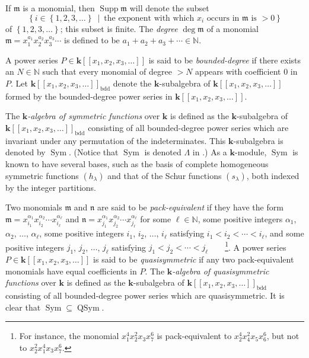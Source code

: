 \documentclass[numbers=enddot,12pt,final,onecolumn,notitlepage,abstracton]{scrartcl}%
\theoremstyle{definition}
\begin{document}
If $\mathfrak{m}$ is a monomial, then $\operatorname*{Supp}\mathfrak{m}$ will
denote the subset
\[
\left\{  i\in\left\{  1,2,3,\ldots\right\}  \ \mid\ \text{the exponent with
which }x_{i}\text{ occurs in }\mathfrak{m}\text{ is }>0\right\}
\]
of $\left\{  1,2,3,\ldots\right\}  $; this subset is finite. The
\textit{degree} $\deg\mathfrak{m}$ of a monomial $\mathfrak{m}=x_{1}^{a_{1}%
}x_{2}^{a_{2}}x_{3}^{a_{3}}\cdots$ is defined to be $a_{1}+a_{2}+a_{3}%
+\cdots\in\mathbb{N}$.

A power series $P\in\mathbf{k}\left[  \left[  x_{1},x_{2},x_{3},\ldots\right]
\right]  $ is said to be \textit{bounded-degree} if there exists an
$N\in\mathbb{N}$ such that every monomial of degree $>N$ appears with
coefficient $0$ in $P$. Let $\mathbf{k}\left[  \left[  x_{1},x_{2}%
,x_{3},\ldots\right]  \right]  _{\operatorname*{bdd}}$ denote the $\mathbf{k}%
$-subalgebra of $\mathbf{k}\left[  \left[  x_{1},x_{2},x_{3},\ldots\right]
\right]  $ formed by the bounded-degree power series in $\mathbf{k}\left[
\left[  x_{1},x_{2},x_{3},\ldots\right]  \right]  $.

The $\mathbf{k}$\textit{-algebra of symmetric functions} over $\mathbf{k}$ is
defined as the $\mathbf{k}$-subalgebra of $\mathbf{k}\left[  \left[
x_{1},x_{2},x_{3},\ldots\right]  \right]  _{\operatorname*{bdd}}$ consisting
of all bounded-degree power series which are invariant under any permutation
of the indeterminates. This $\mathbf{k}$-subalgebra is denoted by
$\operatorname*{Sym}$. (Notice that $\operatorname*{Sym}$ is denoted $\Lambda$
in \cite{Reiner}.) As a $\mathbf{k}$-module, $\operatorname*{Sym}$ is known to
have several bases, such as the basis of complete homogeneous symmetric
functions $\left(  h_{\lambda}\right)  $ and that of the Schur functions
$\left(  s_{\lambda}\right)  $, both indexed by the integer partitions.

Two monomials $\mathfrak{m}$ and $\mathfrak{n}$ are said to be
\textit{pack-equivalent} if they have the form $\mathfrak{m}=x_{i_{1}}%
^{\alpha_{1}}x_{i_{2}}^{\alpha_{2}}\cdots x_{i_{\ell}}^{\alpha_{\ell}}$ and
$\mathfrak{n}=x_{j_{1}}^{\alpha_{1}}x_{j_{2}}^{\alpha_{2}}\cdots x_{j_{\ell}%
}^{\alpha_{\ell}}$ for some $\ell\in\mathbb{N}$, some positive integers
$\alpha_{1}$, $\alpha_{2}$, $\ldots$, $\alpha_{\ell}$, some positive integers
$i_{1}$, $i_{2}$, $\ldots$, $i_{\ell}$ satisfying $i_{1}<i_{2}<\cdots<i_{\ell
}$, and some positive integers $j_{1}$, $j_{2}$, $\ldots$, $j_{\ell}$
satisfying $j_{1}<j_{2}<\cdots<j_{\ell}$\ \ \ \ \footnote{For instance, the
monomial $x_{1}^{4} x_{2}^{2} x_{3} x_{7}^{6}$ is pack-equivalent to
$x_{2}^{4} x_{4}^{2} x_{5} x_{6}^{6}$, but not to $x_{2}^{2} x_{1}^{4} x_{3}
x_{7}^{6}$.}. A power series $P\in\mathbf{k}\left[  \left[  x_{1},x_{2}%
,x_{3},\ldots\right]  \right]  $ is said to be \textit{quasisymmetric} if any
two pack-equivalent monomials have equal coefficients in $P$. The $\mathbf{k}%
$\textit{-algebra of quasisymmetric functions} over $\mathbf{k}$ is defined as
the $\mathbf{k}$-subalgebra of $\mathbf{k}\left[  \left[  x_{1},x_{2}%
,x_{3},\ldots\right]  \right]  _{\operatorname*{bdd}}$ consisting of all
bounded-degree power series which are quasisymmetric. It is clear that
$\operatorname*{Sym}\subseteq\operatorname*{QSym}$.
\end{document}

